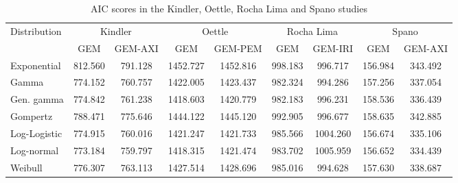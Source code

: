 \begin{table}[h]
    \centering
    \begin{tabular}{lcccccccc}
    \hline
    \multirow{2}{*}{Distribution} & \multicolumn{2}{c}{Kindler} & \multicolumn{2}{c}{Oettle} & \multicolumn{2}{c}{Rocha Lima} & \multicolumn{2}{c}{Spano} \\ \cline{2-9} 
                                  & GEM          & GEM-AXI      & GEM          & GEM-PEM     & GEM           & GEM-IRI        & GEM         & GEM-AXI     \\ \hline
    Exponential                   & 812.560      & 791.128      & 1452.727     & 1452.816    & 998.183       & 996.717        & 156.984     & 343.492     \\
    Gamma                         & 774.152      & 760.757      & 1422.005     & 1423.437    & 982.324       & 994.286        & 157.256     & 337.054     \\
    Gen. gamma             & 774.842      & 761.238      & 1418.603     & 1420.779    & 982.183       & 996.231        & 158.536     & 336.439     \\
    Gompertz                      & 788.471      & 775.646      & 1444.122     & 1445.120    & 992.905       & 996.677        & 158.635     & 342.885     \\
    Log-Logistic                  & 774.915      & 760.016      & 1421.247     & 1421.733    & 985.566       & 1004.260       & 156.674     & 335.106     \\
    Log-normal                    & 773.184      & 759.797      & 1418.315     & 1421.474    & 983.702       & 1005.959       & 156.652     & 334.439     \\
    Weibull                       & 776.307      & 763.113      & 1427.514     & 1428.696    & 985.016       & 994.628        & 157.630     & 338.687     \\ \hline
    \end{tabular}
    \caption{AIC scores in the Kindler, Oettle, Rocha Lima and Spano studies}
    \label{AIC2}
\end{table}
